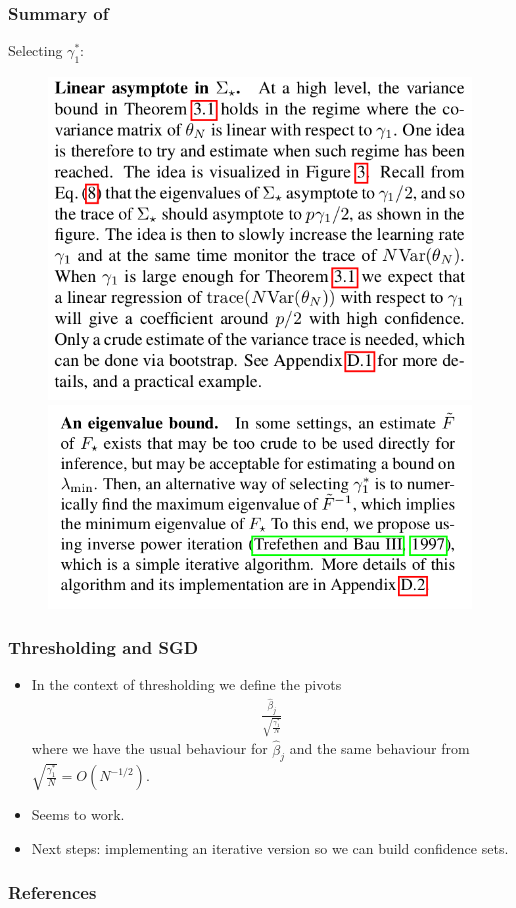 \documentclass{beamer}
\begin{document}
\begin{frame}
  \frametitle{Summary of~\citet{chee:2023}}
  Selecting $\gamma_1^*$:
  \begin{figure}[h!]
    \centering
    \includegraphics[scale=0.25]{s1.png}
    \includegraphics[scale=0.25]{s2.png}
  \end{figure}
\end{frame}


\begin{frame}
  \frametitle{Thresholding and SGD}
  \begin{itemize}
  \item In the context of thresholding we define the pivots
    \begin{align*}
      \frac{\hat{\beta}_j}{\sqrt{\frac{\gamma_1^*}{N}}}
    \end{align*}
    where we have the usual behaviour for $\hat{\beta}_j$ and the same behaviour from $\sqrt{\frac{\gamma_1^*}{N}} = O(N^{-1/2})$.
  \item Seems to work.
  \item Next steps: implementing an iterative version so we can build confidence sets. 
  \end{itemize}
\end{frame}

\begin{frame}
  \frametitle{References}
  
  
\end{frame}
\end{document}

